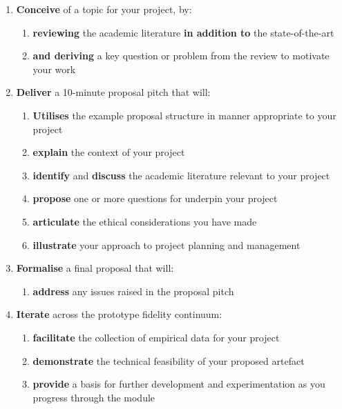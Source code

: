\begin{enumerate}[label=(\Alph*)]

	\item \textbf{Conceive} of a topic for your project, by:
		\begin{enumerate}[label=(\roman*)]
			\item \textbf{reviewing} the academic literature \textbf{in addition to} the state-of-the-art
			\item \textbf{and deriving} a key question or problem from the review to motivate your work
		\end{enumerate}

	\item \textbf{Deliver} a 10-minute proposal pitch that will:
		\begin{enumerate}[label=(\roman*)]
			\item \textbf{Utilises} the example proposal structure in manner appropriate to your project
			\item \textbf{explain} the context of your project
			\item \textbf{identify} and \textbf{discuss} the academic literature relevant to your project
			\item \textbf{propose} one or more questions for underpin your project
			\item \textbf{articulate} the ethical considerations you have made
			\item \textbf{illustrate} your approach to project planning and management
		\end{enumerate}
	
	\item \textbf{Formalise} a final proposal that will:
		\begin{enumerate}[label=(\roman*)]
			\item \textbf{address} any issues raised in the proposal pitch
		\end{enumerate}

	\item \textbf{Iterate} across the prototype fidelity continuum:
		\begin{enumerate}[label=(\roman*)]
			\item \textbf{facilitate} the collection of empirical data for your project
			\item \textbf{demonstrate} the technical feasibility of your proposed artefact
			\item \textbf{provide} a basis for further development and experimentation as you progress through the module
		\end{enumerate}
	

\end{enumerate}
